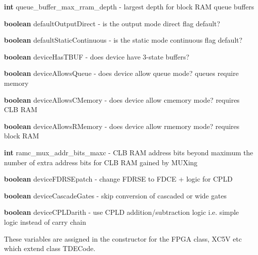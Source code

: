 \item   {\bf int} queue\_buffer\_max\_rram\_depth - largest depth for block RAM queue buffers

\item   {\bf boolean} defaultOutputDirect - is the output mode direct flag default?

\item   {\bf boolean} defaultStaticContinuous - is the static mode continuous flag default?

\item   {\bf boolean} deviceHasTBUF - does device have 3-state buffers?

\item   {\bf boolean} deviceAllowsQueue - does device allow queue mode?
                                         queues require memory

\item   {\bf boolean} deviceAllowsCMemory - does device allow cmemory mode?
                                         requires CLB RAM

\item   {\bf boolean} deviceAllowsRMemory - does device allow rmemory mode?
                                         requires block RAM

\item   {\bf int} ramc\_mux\_addr\_bits\_maxc - CLB RAM address bits beyond maximum
                                         the number of extra address bits for
                                         CLB RAM gained by MUXing

\item   {\bf boolean} deviceFDRSEpatch - change FDRSE to FDCE + logic for CPLD

\item   {\bf boolean} deviceCascadeGates - skip conversion of cascaded or wide gates

\item   {\bf boolean} deviceCPLDarith - use CPLD addition/subtraction logic
                                         i.e. simple logic instead of carry chain
\blend

These variables are assigned in the constructor for the FPGA class, XC5V etc
which extend class TDECode.



